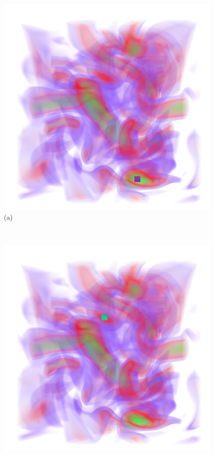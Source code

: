 \documentclass[twoside,twocolumn,10pt]{article}
\begin{document}
\begin{figure}
	\centering
	\begin{minipage}{.16\textwidth}
		\centering
		\includegraphics[width=1\linewidth]{crop/vortex_selection_green}
		(a)
	\end{minipage}~
	\begin{minipage}{.16\textwidth}
		\centering
		\includegraphics[width=1\linewidth]{crop/vortex_selection_red}

\end{minipage}
\end{figure}
\end{document}
